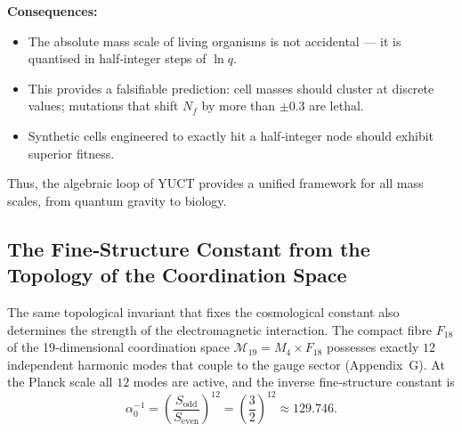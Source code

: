 \documentclass[12pt,a4paper]{article}
\begin{document}
\textbf{Consequences:}
\begin{itemize}
	\item The absolute mass scale of living organisms is not accidental — it is quantised in half‑integer steps of \(\ln q\).
	\item This provides a falsifiable prediction: cell masses should cluster at discrete values; mutations that shift \(N_f\) by more than \(\pm0.3\) are lethal.
	\item Synthetic cells engineered to exactly hit a half‑integer node should exhibit superior fitness.
\end{itemize}

Thus, the algebraic loop of YUCT provides a unified framework for all mass scales, from quantum gravity to biology.

\subsection{The Fine‑Structure Constant from the Topology of the Coordination Space}
\label{subsec:alpha-topology}

The same topological invariant that fixes the cosmological constant also determines
the strength of the electromagnetic interaction.  The compact fibre \(F_{18}\) of the
19‑dimensional coordination space \(\mathcal{M}_{19}=M_4\times F_{18}\) possesses
exactly \(12\) independent harmonic modes that couple to the gauge sector
(Appendix~G).  At the Planck scale all \(12\) modes are active, and the inverse
fine‑structure constant is
\begin{equation}
	\alpha_0^{-1} = \left(\frac{S_{\mathrm{odd}}}{S_{\mathrm{even}}}\right)^{12}
	= \left(\frac{3}{2}\right)^{12} \approx 129.746 .
\end{equation}
\end{document}
